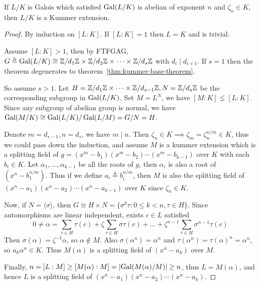 \begin{theorem}
  If $L/K$ is Galois which satisfied $\operatorname{Gal}(L/K)$ is abelian of exponent $n$ and $\zeta_n \in K$,
  then $L/K$ is a Kummer extension.

  \begin{proof}
    By induction on $[L: K]$. If $[L: K] = 1$ then $L = K$ and is trivial.

    Assume $[L: K] > 1$, then by FTFGAG, $G \triangleq \operatorname{Gal}(L/K) \cong {\mathbb{Z}}/{d_1 \mathbb{Z}}
    \times {\mathbb{Z}}/{d_2 \mathbb{Z}} \times \dots \times {\mathbb{Z}}/{d_s \mathbb{Z}}$ with $d_i \mid d_{i+1}$.
    If $s = 1$ then the theorem degenerates to theorem~\ref{thm:kummer-base-theorem}.

    So assume $s > 1$. Let $H = \mathbb{Z} / d_1 \mathbb{Z} \times \dots \times \mathbb{Z} / d_{s-1} \mathbb{Z},
    N = \mathbb{Z} / d_s \mathbb{Z}$ be the corresponding subgroup in $\operatorname{Gal}(L/K)$.
    Set $M = L^N$, we have $[M: K] \lneq [L: K]$. Since any subgroup
    of abelian group is normal, we have $\operatorname{Gal}(M/K) \cong \operatorname{Gal}(L/K) / \operatorname{Gal}(L/M) = G / N = H$.

    Denote $m = d_{s-1}, n = d_{s}$, we have $m \mid n$.
    Then $\zeta_n \in K \implies \zeta_m = \zeta_n^{n/m} \in K$,
    thus we could pass down the induction, and assume $M$ is a kummer extension which is a splitting
    field of $g = (x^m - b_1) (x^m - b_2) \dotsm (x^m - b_{k-1})$ over $K$ with each $b_i \in K$.
    Let $\alpha_1, \dots, \alpha_{k-1}$ be all the roots of $g$, then $\alpha_i$
    is also a root of $(x^n - b_1^{n/m})$. Thus if we define $a_i \triangleq b_i^{n/m}$, then
    $M$ is also the splitting field of $(x^n - a_1) (x^n - a_2) \dotsm (x^n - a_{k-1})$ over $K$
    since $\zeta_n \in K$.

    Now, if $N = \langle \sigma \rangle$, then $G \cong H \times N = \{\sigma^k \tau : 0 \leq k < n, \tau \in H\}$.
    Since automorphisms are linear independent, exists $c \in L$ satisfied
    \[ 0 \neq \alpha = \sum_{\tau \in H} \tau(c) + \zeta \sum_{\tau \in H} \sigma \tau(c)
    + \dots + \zeta^{n-1} \sum_{\tau \in H} \sigma^{n-1} \tau(c) \]
    Then $\sigma(\alpha) = \zeta^{-1} \alpha$, so $\alpha \not\in M$. Also $\sigma(\alpha^n) = \alpha^n$
    and $\tau(\alpha^n) = \tau(\alpha)^n = \alpha^n$, so $a_k \alpha^n \in K$.
    Thus $M(\alpha)$ is a splitting field of $(x^n - a_k)$ over $M$.

    Finally, $n = [L: M] \geq [M(\alpha): M] = \lvert\operatorname{Gal}(M(\alpha) / M)\rvert \geq n$,
    thus $L = M(\alpha)$, and hence $L$ is a splitting field of
    $(x^n - a_1) (x^n - a_2) \dotsm (x^n - a_k)$.
  \end{proof}
\end{theorem}

